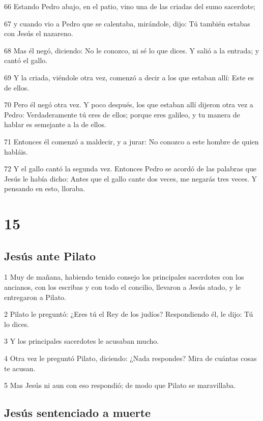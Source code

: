\par 66 Estando Pedro abajo, en el patio, vino una de las criadas del sumo sacerdote;
\par 67 y cuando vio a Pedro que se calentaba, mirándole, dijo: Tú también estabas con Jesús el nazareno.
\par 68 Mas él negó, diciendo: No le conozco, ni sé lo que dices. Y salió a la entrada; y cantó el gallo.
\par 69 Y la criada, viéndole otra vez, comenzó a decir a los que estaban allí: Este es de ellos.
\par 70 Pero él negó otra vez. Y poco después, los que estaban allí dijeron otra vez a Pedro: Verdaderamente tú eres de ellos; porque eres galileo, y tu manera de hablar es semejante a la de ellos.
\par 71 Entonces él comenzó a maldecir, y a jurar: No conozco a este hombre de quien habláis.
\par 72 Y el gallo cantó la segunda vez. Entonces Pedro se acordó de las palabras que Jesús le había dicho: Antes que el gallo cante dos veces, me negarás tres veces. Y pensando en esto, lloraba.

\chapter{15}

\section*{Jesús ante Pilato}

\par 1 Muy de mañana, habiendo tenido consejo los principales sacerdotes con los ancianos, con los escribas y con todo el concilio, llevaron a Jesús atado, y le entregaron a Pilato.
\par 2 Pilato le preguntó: ¿Eres tú el Rey de los judíos? Respondiendo él, le dijo: Tú lo dices.
\par 3 Y los principales sacerdotes le acusaban mucho.
\par 4 Otra vez le preguntó Pilato, diciendo: ¿Nada respondes? Mira de cuántas cosas te acusan.
\par 5 Mas Jesús ni aun con eso respondió; de modo que Pilato se maravillaba.

\section*{Jesús sentenciado a muerte}

